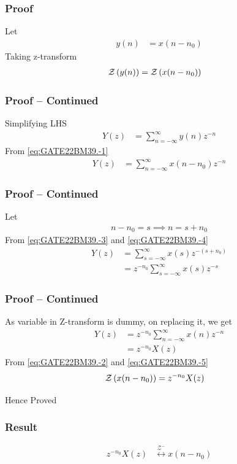 \documentclass{beamer}
\begin{document}
\begin{frame}
\frametitle{Proof}
Let
\begin{align}
y(n) &= x(n-n_0) \label{eq:GATE22BM39.-1}
\end{align}
Taking z-transform
\begin{align}
\mathcal{Z}\left(y(n)\right) &= \mathcal{Z}\left(x(n-n_0)\right) \label{eq:GATE22BM39.-2}
\end{align}
\end{frame}

\begin{frame}
\frametitle{Proof -- Continued}
Simplifying LHS
\begin{align}
Y(z) &= \sum_{n=-\infty}^{\infty} y(n)z^{-n} 
\end{align}
From \eqref{eq:GATE22BM39.-1}
\begin{align}
Y(z) &= \sum_{n=-\infty}^{\infty} x(n-n_0) z^{-n} \label{eq:GATE22BM39.-3}
\end{align}
\end{frame}

\begin{frame}
\frametitle{Proof -- Continued}
Let 
\begin{align}
n-n_0 = s  \implies
n = s+n_0 \label{eq:GATE22BM39.-4}
\end{align}
From \eqref{eq:GATE22BM39.-3} and \eqref{eq:GATE22BM39.-4}
\begin{align}
Y(z) &= \sum_{s=-\infty}^{\infty} x(s) z^{-(s+n_0)} \\
&= z^{-n_0}\sum_{s=-\infty}^{\infty} x(s) z^{-s} 
\end{align}
\end{frame}

\begin{frame}
\frametitle{Proof -- Continued}
As variable in Z-transform is dummy, on replacing it, we get
\begin{align}
Y(z) &= z^{-n_0}\sum_{n=-\infty}^{\infty} x(n) z^{-n} \\
&= z^{-n_0}X(z) \label{eq:GATE22BM39.-5}
\end{align}
From \eqref{eq:GATE22BM39.-2} and \eqref{eq:GATE22BM39.-5}
\begin{align}
\mathcal{Z}\left(x(n-n_0)\right) &= z^{-n_0}X(z)
\end{align}
\begin{center}
Hence Proved
\end{center} 
\end{frame}

\begin{frame}
\frametitle{Result}
\begin{align}
z^{-n_0}X(z) &\overset{\mathcal{Z^{-}}}{\longleftrightarrow} x(n-n_0) \label{eq:GATE22BM39.-6}
\end{align}
\end{frame}
\end{document}
